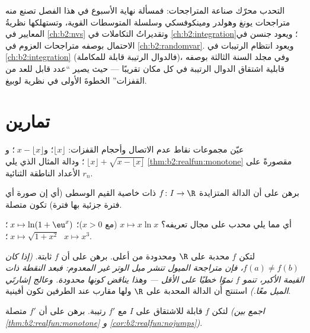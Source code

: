 \begin{remark}
التحدب محرّك صناعة المتراجحات: فمسألة نهاية الأسبوع في هذا
الفصل تصنع منه متراجحات يونغ وهولدر ومينكوفسكي
وسلسلة المتوسطات القوية، وتستهلكها نظريةُ المعايير في \cref{ch:b2:nvs}
وتقديراتُ التكاملات في \cref{ch:b2:integration}؛
ويعود جنسن في الاحتمال بوصفه متراجحات العزوم في
\cref{ch:b2:randomvar}. ويعود انتظام الرتيبات في
\cref{ch:b2:integration} (فالدوال الرتيبة قابلة للمكاملة)، وفي
مجلد السنة الثالثة بوصفه قابلية اشتقاق الدوال الرتيبة في
كل مكان تقريبًا --- حيث يصير ``عدد قابل للعد من القفزات''
الخطوةَ الأولى في نظرية لوبيغ.
\end{remark}

\section{تمارين}

\begin{exercise}[$\star$]\label{exo:b2:realfun:1}
عيّن مجموعات نقاط عدم الاتصال وأحجام القفزات: $\lfloor x
\rfloor$؛ و$\;x - \lfloor x\rfloor$؛ و$\;\lfloor x \rfloor + \sqrt{x
- \lfloor x\rfloor}$؛ ودالة المثال الذي يلي
\cref{thm:b2:realfun:monotone} مقصورةً على الأعداد الناطقة الثنائية
$r_n$.
\end{exercise}

\begin{exercise}[$\star$]\label{exo:b2:realfun:2}
برهن على أن الدالة المتزايدة $f \colon I \to \R$ ذات خاصية
القيم الوسطى (أي إن صورة أي فترة جزئية بها فترة) تكون
متصلة.
\end{exercise}

\begin{exercise}[$\star$]\label{exo:b2:realfun:3}
أي مما يلي محدب على مجال تعريفه؟ $x \mapsto
x\ln x$ (مع $x > 0$)؛ $\;x \mapsto \ln(1 + \eu^x)$؛ $\;x \mapsto
\sqrt{1 + x^2}$؛ $\;x \mapsto x^3$.
\end{exercise}

\begin{exercise}[$\star\star$]\label{exo:b2:realfun:4}
لتكن $f$ محدبة على $\R$ ومحدودة من أعلى. برهن على أن $f$
ثابتة. \emph{(إذا كان $f(a) \neq f(b)$، فإن متراجحة الميول
تنشر ميل الوتر غير المعدوم: فبعد النقطة ذات القيمة الأكبر،
تنمو $f$ نموًا خطيًا على الأقل --- وهذا يناقض كونها محدودة.
وعالج إشارتَي الميل معًا.)} استنتج أن الدالة المحدبة على
$\R$ ولها مقارب عند الطرفين تكون أفينية.
\end{exercise}

\begin{exercise}[$\star\star$]\label{exo:b2:realfun:5}
لتكن $f$ قابلة للاشتقاق على $I$ مع $f'$ رتيبة. برهن على أن
$f'$ متصلة \emph{(اجمع بين
\cref{thm:b2:realfun:monotone} و
\cref{cor:b2:realfun:nojumps})}.
\end{exercise}

